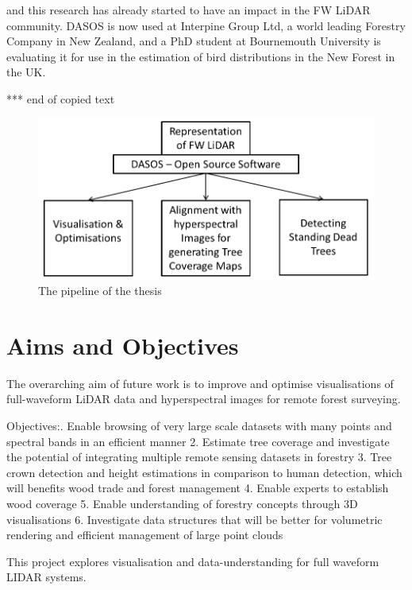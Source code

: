 \documentclass{subfiles}
\begin{document}
 and this research has already started to have an impact in the FW LiDAR community. DASOS is now used at Interpine Group Ltd, a world leading Forestry Company in New Zealand, and a PhD student at Bournemouth University is evaluating it for use in the estimation of bird distributions in the New Forest in the UK.

	
	\par {\color{red} *** end of copied text}
	




\begin{figure}
	\includegraphics[width=\textwidth]{tex/Pipeline/Pipeline.png}
	\caption{The pipeline of the thesis}
\end{figure}


\section {Aims and Objectives}

The overarching aim of future work is to improve and optimise visualisations of full-waveform LiDAR data and hyperspectral images for remote forest surveying.

Objectives:.	Enable browsing of very large scale datasets with many points and spectral bands in an efficient manner
2.	Estimate tree coverage and investigate the potential of integrating multiple remote sensing datasets in forestry
3.	Tree crown detection and height estimations in comparison to human detection, which will benefits wood trade and forest management
4.	Enable experts to establish wood coverage 
5.	Enable understanding of forestry concepts through 3D visualisations
6.	Investigate data structures that will be better for volumetric rendering and efficient management of large point clouds

This project explores visualisation and data-understanding for full waveform LIDAR systems. 
\end{document}
